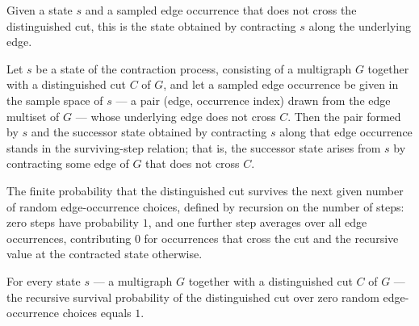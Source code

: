 \begin{definition}
\label{KargerTrace.stateAfterSurvivingChoice}
\leanok
{}
Given a state $s$ and a sampled edge occurrence that does not cross the distinguished cut,
this is the state obtained by contracting $s$ along the underlying edge.
\end{definition}

\begin{lemma}
\label{KargerTrace.stateAfterSurvivingChoice_step}
\leanok
{}
Let $s$ be a state of the contraction process, consisting of a multigraph $G$ together
with a distinguished cut $C$ of $G$, and let a sampled edge occurrence be given in the
sample space of $s$ — a pair (edge, occurrence index) drawn from the edge multiset of
$G$ — whose underlying edge does not cross $C$. Then the pair formed by $s$ and the
successor state obtained by contracting $s$ along that edge occurrence stands in the
surviving-step relation; that is, the successor state arises from $s$ by contracting
some edge of $G$ that does not cross $C$.
\end{lemma}

\begin{definition}
\label{KargerTrace.survivalEventProb}
\leanok
{}
The finite probability that the distinguished cut survives the next given number of random
edge-occurrence choices, defined by recursion on the number of steps: zero steps have
probability $1$, and one further step averages over all edge occurrences, contributing $0$
for occurrences that cross the cut and the recursive value at the contracted state
otherwise.
\end{definition}

\begin{lemma}
\label{KargerTrace.survivalEventProb_zero}
\leanok
{}
For every state $s$ — a multigraph $G$ together with a distinguished cut $C$ of $G$ —
the recursive survival probability of the distinguished cut over zero random
edge-occurrence choices equals $1$.
\end{lemma}

